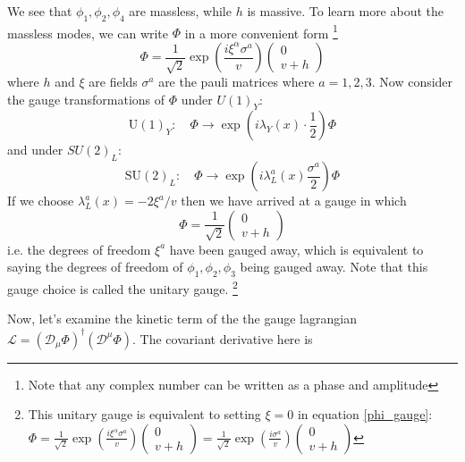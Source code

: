 \documentclass[11pt]{article}
\begin{document}
{We see that $\phi_1, \phi_2, \phi_4$ are massless, while $h$  is massive. To learn more about the massless modes, we can write $\Phi$ in a more convenient form 
\footnote{Note that any complex number can be written as a phase and amplitude}
\begin{equation}
    \Phi=\frac{1}{\sqrt{2}} \exp \left(\frac{i \xi^{\alpha} \sigma^{a}}{v}\right)\left(\begin{array}{c}
0 \\
v+h
\end{array}\right)
\label{phi_gauge}
\end{equation}
where $h$ and $\xi$ are fields $\sigma^a$ are the pauli matrices where $a=1,2,3$. Now consider the gauge transformations of $\Phi$ under $U(1)_Y$: 
\begin{equation}
    \mathrm{U}(1)_{Y}: \quad \Phi \rightarrow \exp \left(i \lambda_{Y}(x) \cdot \frac{1}{2}\right) \Phi
\end{equation}
and under $SU(2)_L$:
\begin{equation}
    \mathrm{SU}(2)_{L}: \quad \Phi \rightarrow \exp \left(i \lambda_{L}^{a}(x) \frac{\sigma^{a}}{2}\right) \Phi
\end{equation}
If we choose $\lambda_{L}^{a}(x)=-2 \xi^{a} / v$ then we have arrived at a gauge in which 
\begin{equation}
    \Phi=\frac{1}{\sqrt{2}}\left(\begin{array}{c}
0 \\
v+h
\end{array}\right)
\end{equation}
i.e. the degrees of freedom $\xi^a$ have been gauged away, which is equivalent to saying the degrees of freedom of $\phi_1, \phi_2, \phi_3$ being gauged away. Note that this gauge choice is called the unitary gauge.
\footnote{This unitary gauge is equivalent to setting $\xi = 0$ in equation \ref{phi_gauge}: $\Phi=\frac{1}{\sqrt{2}} \exp \left(\frac{i \xi^{\alpha} \sigma^{a}}{v}\right)\left(\begin{array}{c}
0 \\
v+h
\end{array}\right) = \frac{1}{\sqrt{2}} \exp \left(\frac{i  \sigma^{a}}{v}\right)\left(\begin{array}{c}
0 \\
v+h
\end{array}\right)$ }

Now, let's examine the kinetic term of the the gauge lagrangian $\mathcal{L} = \left(\mathcal{D}_{\mu} \Phi\right)^{\dagger}\left(\mathcal{D}^{\mu} \Phi\right)$. The covariant derivative here is

}
\end{document}
